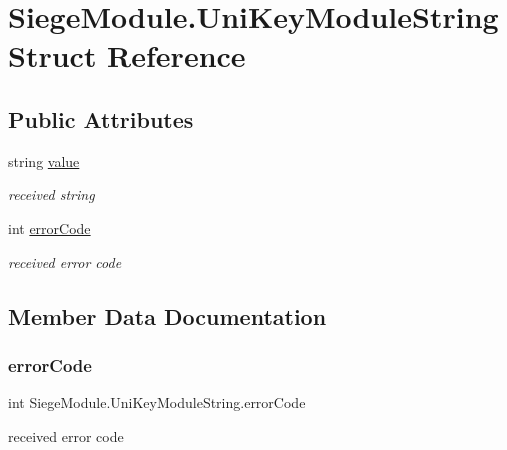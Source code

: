 \hypertarget{struct_siege_module_1_1_uni_key_module_string}{}\section{Siege\+Module.\+Uni\+Key\+Module\+String Struct Reference}
\label{struct_siege_module_1_1_uni_key_module_string}
\subsection*{Public Attributes}
\begin{DoxyCompactItemize}
\item 
string \mbox{\hyperlink{struct_siege_module_1_1_uni_key_module_string_a0e7f26f2e39fa1f1cc0501a5936add2c}{value}}
\begin{DoxyCompactList}\small\item\em received string \end{DoxyCompactList}\item 
int \mbox{\hyperlink{struct_siege_module_1_1_uni_key_module_string_a7417d6c1dedd944789d0205ff2dabdf3}{error\+Code}}
\begin{DoxyCompactList}\small\item\em received error code \end{DoxyCompactList}\end{DoxyCompactItemize}


\subsection{Member Data Documentation}
\mbox{\label{struct_siege_module_1_1_uni_key_module_string_a7417d6c1dedd944789d0205ff2dabdf3}} 
\subsubsection{\texorpdfstring{error\+Code}{errorCode}}
{\footnotesize\ttfamily int Siege\+Module.\+Uni\+Key\+Module\+String.\+error\+Code}



received error code 

\mbox{\label{struct_siege_module_1_1_uni_key_module_string_a0e7f26f2e39fa1f1cc0501a5936add2c}} 
